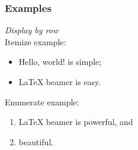 \documentclass{beamer}
\begin{document}
\begin{frame}\frametitle{Examples}
  \emph{Display by row} \\
  Itemize example: \pause
  \begin{itemize}
  \item Hello, world! is simple;  \pause
  \item \LaTeX{} beamer is easy. \pause
  \end{itemize}
  Enumerate example: \pause
  \begin{enumerate}
  \item \LaTeX{} beamer is powerful, and \pause
  \item beautiful. \pause
  \end{enumerate}
\end{frame}
\end{document}

